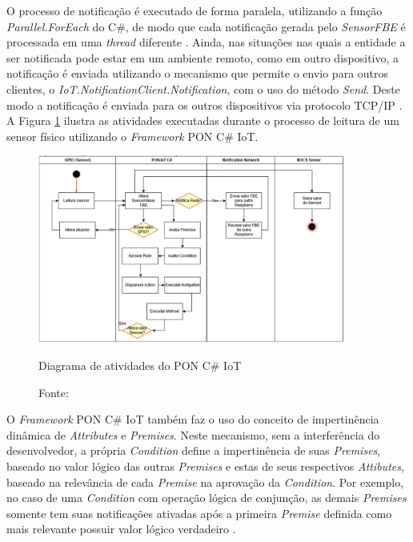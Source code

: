 O processo de notificação é executado de forma paralela, utilizando a função
\textit{Parallel.ForEach} do C\#, de modo que cada notificação gerada pelo
\textit{SensorFBE} é processada em uma \textit{thread} diferente
\cite{msc_oliveira_2019}. Ainda, nas situações nas quais a entidade a ser
notificada pode estar em um ambiente remoto, como em outro dispositivo, a
notificação é enviada utilizando o mecanismo que permite o envio para outros
clientes, o \textit{IoT.NotificationClient.Notification}, com o uso do método
\textit{Send}. Deste modo a notificação é enviada para os outros dispositivos
via protocolo TCP/IP \cite{msc_oliveira_2019}. A Figura \ref{fig:ativ_pon_iot}
ilustra as atividades executadas durante o processo de leitura de um sensor
físico utilizando o \textit{Framework} PON C\# IoT.

\begin{figure}[!htb]
  \centering
  \includegraphics[width=0.9\textwidth]{../figures/pon_iot_flow.png}
  \caption{Diagrama de atividades do PON C\# IoT}
  \caption*{Fonte: }
  \label{fig:ativ_pon_iot}
\end{figure}

O \textit{Framework} PON C\# IoT também faz o uso do conceito de impertinência
dinâmica de \textit{Attributes} e \textit{Premises}. Neste mecanismo, sem a
interferência do desenvolvedor, a própria \textit{Condition} define a
impertinência de suas \textit{Premises}, baseado no valor lógico das outras
\textit{Premises} e estas de seus respectivos \textit{Attibutes}, baseado na
relevância de cada \textit{Premise} na aprovação da \textit{Condition}. Por
exemplo, no caso de uma \textit{Condition} com operação lógica de conjunção, as
demais \textit{Premises} somente tem suas notificações ativadas após a primeira
\textit{Premise} definida como mais relevante possuir valor lógico verdadeiro
\cite{msc_oliveira_2019}. 

